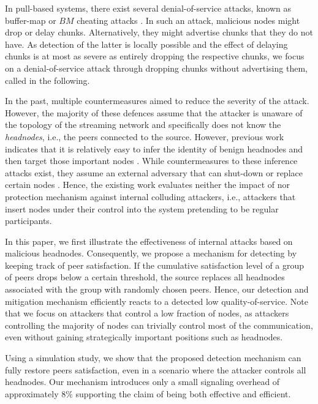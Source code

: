 In pull-based systems, there exist several denial-of-service attacks, known as buffer-map or $BM$ cheating attacks \cite{cheatingAnalysis}. 
In such an attack, malicious nodes might drop or delay chunks. Alternatively, they might advertise chunks that they do not have. As detection of the latter is locally possible and the effect of delaying chunks is at most as severe as entirely dropping the respective chunks, we focus on a denial-of-service attack through dropping chunks without advertising them, called \drop in the following.  


In the past, multiple countermeasures aimed to reduce the severity of the \drop attack. However, the majority of these defences \cite{zhang2005coolstreaming, defending2, antiliar} assume that the attacker is unaware of the topology of the streaming network and specifically does not know the \emph{headnodes}, i.e., the peers connected to the source. 
However, previous work indicates that it is relatively easy to infer the identity of benign headnodes and then target those important nodes \cite{nguyen2016swap}.
While countermeasures to these inference attacks exist, they assume an external adversary that can shut-down or replace certain nodes \cite{nguyen2016swap, rbcs, nguyen2014resilience}. 
Hence, the existing work evaluates neither the impact of nor protection mechanism against internal colluding attackers, i.e., attackers that insert nodes under their control into the system pretending to be regular participants. 


In this paper, we first illustrate the effectiveness of internal attacks based on malicious headnodes. 
Consequently, we propose a mechanism for detecting \drop by keeping track of peer satisfaction. If the cumulative satisfaction level of a group of peers drops below a certain threshold, the source replaces all headnodes associated with the group with randomly chosen peers. 
Hence, our detection and mitigation mechanism efficiently reacts to a detected low quality-of-service.
Note that we focus on attackers that control a low fraction of nodes, as attackers controlling the majority of nodes can trivially control most of the communication, even without gaining strategically important positions such as headnodes.    

Using a simulation study, we show that the proposed detection mechanism can fully restore peers satisfaction, even in a scenario where the attacker controls all headnodes. 
Our mechanism introduces only a small signaling overhead of approximately $8\%$ supporting the claim of being both effective and efficient.

